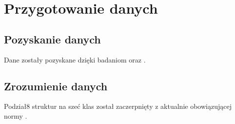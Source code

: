 \chapter{Przygotowanie danych}
\label{cha:przyg.danych}

\section{Pozyskanie danych}
\label{sec:pozyskanie_danych}
Dane zostały pozyskane dzięki badaniom \cite{Pirowski17} oraz \cite{specodlew}. 

\section{Zrozumienie danych}
\label{sec:zrozumienie_danych}
Podział8 struktur na szeć klas został zaczerpnięty z aktualnie obowiązującej normy \cite{norma}.


%
%
%
%
%
%
%
%
%
%
%
%
%
%
%
%
%
%
%
%
%
%
%
%
%
%
%
%
%
%
%
%
%
%
%
%
%
%
%
%
%
%
%
%
%
%
%
%
%
%
%
%
%





















